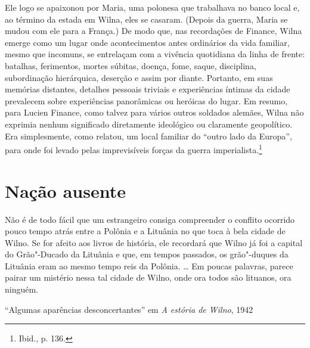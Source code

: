 Ele logo se apaixonou por Maria, uma polonesa que trabalhava no banco
local e, ao término da estada em Wilna, eles se casaram. (Depois da
guerra, Maria se mudou com ele para a França.) De modo que, nas
recordações de Finance, Wilna emerge como um lugar onde acontecimentos
antes ordinários da vida familiar, mesmo que incomuns, se entrelaçam com
a vivência quotidiana da linha de frente: batalhas, ferimentos, mortes
súbitas, doença, fome, saque, disciplina, subordinação hierárquica,
deserção e assim por diante. Portanto, em suas memórias distantes,
detalhes pessoais triviais e experiências íntimas da cidade prevalecem
sobre experiências panorâmicas ou heróicas do lugar. Em resumo, para
Lucien Finance, como talvez para vários outros soldados alemães, Wilna
não exprimia nenhum significado diretamente ideológico ou claramente
geopolítico. Era simplesmente, como relatou, um local familiar do
``outro lado da Europa'', para onde foi levado pelas imprevisíveis
forças da guerra imperialista.\footnote{Ibid., p. 136.}

%

\chapter{Nação ausente}

\epigraph{Não é de todo fácil que um estrangeiro consiga compreender o conflito
ocorrido pouco tempo atrás entre a Polônia e a Lituânia no que toca à
bela cidade de Wilno. Se for afeito aos livros de história, ele
recordará que Wilno já foi a capital do Grão"-Ducado da Lituânia e que,
em tempos passados, os grão"-duques da Lituânia eram ao mesmo tempo reis
da Polônia. \ldots{} Em poucas palavras, parece pairar um mistério nessa
tal cidade de Wilno, onde ora todos são lituanos, ora ninguém.}{``Algumas aparências desconcertantes'' em \emph{A estória de Wilno}, 1942}

